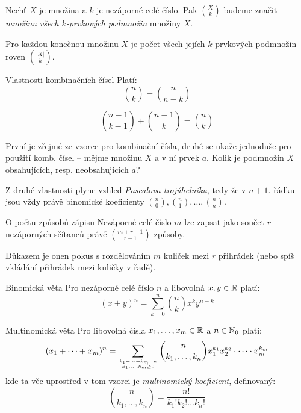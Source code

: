 \begin{definice}
Nechť $X$ je množina a $k$ je nezáporné celé číslo. Pak $\binom{X}{k}$ budeme značit \emph{ množinu všech $k$-prvkových podmnožin} množiny $X$.
\end{definice}

\begin{veta}
Pro každou konečnou množinu $X$ je počet všech jejích $k$-prvkových podmnožin roven $\binom{|X|}{k}$.
\end{veta}

\begin{vetaN}{Vlastnosti kombinačních čísel}
Platí:
$$
\binom{n}{k} = \binom{n}{n-k}
$$

$$
\binom{n-1}{k-1} + \binom{n-1}{k} = \binom{n}{k}
$$

\begin{dukaz}
První je zřejmé ze vzorce pro kombinační čísla, druhé se ukaže jednoduše pro použití komb. čísel -- mějme množinu $X$ a v ní prvek $a$. Kolik je podmnožin $X$ obsahujících, resp. neobsahujících $a$?
\end{dukaz}
\end{vetaN}

\begin{dusledek}
Z druhé vlastnosti plyne vzhled \emph{Pascalova trojúhelníku}, tedy že v $n+1$. řádku jsou vždy právě binomické koeficienty $\binom{n}{0},\binom{n}{1},\dots,\binom{n}{n}$.
\end{dusledek}

\begin{vetaN}{O počtu způsobů zápisu}
Nezáporné celé číslo $m$ lze zapsat jako součet $r$ nezáporných sčítanců právě $\binom{m+r-1}{r-1}$ způsoby.

\begin{dukaz}
Důkazem je onen pokus s rozdělováním $m$ kuliček mezi $r$ přihrádek (nebo spíš vkládání přihrádek mezi kuličky v řadě).
\end{dukaz}
\end{vetaN}

\begin{vetaN}{Binomická věta}
Pro nezáporné celé číslo $n$ a libovolná $x,y\in\mathbb{R}$ platí: $$(x+y)^n=\sum_{k=0}^{n} \binom{n}{k} x^k y^{n-k}$$
\end{vetaN}

\begin{vetaN}{Multinomická věta}
Pro libovolná čísla $x_1,\dots,x_m\in\mathbb{R}$ a $n\in\mathbb{N}_0$ platí: 
$$(x_1+\dots+x_m)^n=\sum_{\genfrac{}{}{0pt}{}{k_1+\dots+k_m=n}{k_1,\dots,k_m\geq 0}}\binom{n}{k_1,\dots,k_n}x_1^{k_1}x_2^{k_2}\cdot\dots\cdot x_m^{k_m}$$
kde ta věc uprostřed v tom vzorci je \emph{multinomický koeficient}, definovaný:
$$\binom{n}{k_1,\dots,k_n}=\frac{n!}{k_1!k_2!\dots k_n!}$$
\end{vetaN}

